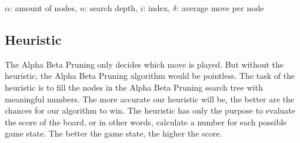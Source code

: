 \begin{center}
$\alpha$: amount of nodes,
$n$: search depth,
$i$: index,
$\delta$: average move per node
\end{center}


\subsection{Heuristic}
The Alpha Beta Pruning only decides which move is played. But without the heuristic, the Alpha Beta Pruning algorithm would be pointless. The task of the heuristic is to fill the nodes in the Alpha Beta Pruning search tree with meaningful numbers. The more accurate our heuristic will be, the better are the chances for our algorithm to win. The heuristic has only the purpose to evaluate the score of the board, or in other words, calculate a number for each possible game state. The better the game state, the higher the score.

